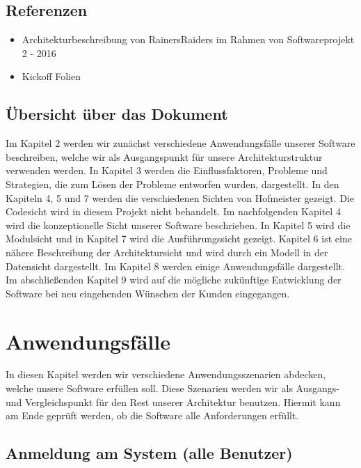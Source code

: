 \documentclass[enabledeprecatedfontcommands,fontsize=12pt,paper=a4,twoside]{scrartcl}
\begin{document}
\subsection{Referenzen}
\begin{itemize}
  \item Architekturbeschreibung von RainersRaiders im Rahmen von Softwareprojekt 2 - 2016
  \item Kickoff Folien
\end{itemize}
\subsection{Übersicht über das Dokument}

{  Im Kapitel 2 werden wir zunächst verschiedene Anwendungsfälle unserer Software beschreiben, welche wir als Ausgangspunkt für unsere Architekturstruktur verwenden werden. In Kapitel 3 werden die Einflussfaktoren, Probleme und Strategien, die zum Lösen der Probleme entworfen wurden, dargestellt.
In den Kapiteln 4, 5 und 7 werden die verschiedenen Sichten von Hofmeister gezeigt. Die Codesicht wird in diesem Projekt nicht behandelt.
Im nachfolgenden Kapitel 4 wird die konzeptionelle Sicht unserer Software beschrieben. In Kapitel 5 wird die Modulsicht und in Kapitel 7 wird die Ausführungssicht gezeigt. Kapitel 6 ist eine nähere Beschreibung der Architektursicht und wird durch ein Modell in der Datensicht dargestellt.
Im Kapitel 8 werden einige Anwendungsfälle dargestellt. Im abschließenden Kapitel 9 wird auf die mögliche zukünftige Entwicklung der Software bei neu eingehenden Wünschen der Kunden eingegangen.

}



\section{Anwendungsfälle}

In diesen Kapitel werden wir verschiedene Anwendungsszenarien abdecken, welche unsere Software erfüllen soll. Diese Szenarien werden wir als Ausgangs- und Vergleichspunkt für den Rest unserer Architektur benutzen. Hiermit kann am Ende geprüft werden, ob die Software alle Anforderungen erfüllt. 

\subsection{Anmeldung am System (alle Benutzer)}
\end{document}
